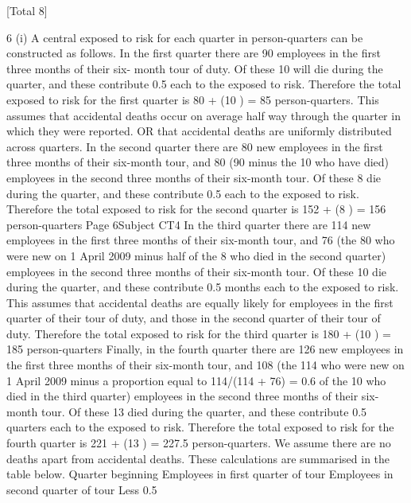 [Total 8]


\newpage


6
(i)
A central exposed to risk for each quarter in person-quarters can be
constructed as follows.
In the first quarter there are 90 employees in the first three months of their six-
month tour of duty. Of these 10 will die during the quarter, and these
contribute 0.5 each to the exposed to risk.
Therefore the total exposed to risk for the first quarter is
80 + (10 ) = 85 person-quarters.
This assumes that accidental deaths occur on average half way
through the quarter in which they were reported. OR that accidental
deaths are uniformly distributed across quarters.
In the second quarter there are 80 new employees in the first three months of
their six-month tour, and 80 (90 minus the 10 who have died) employees in
the second three months of their six-month tour. Of these 8 die during the
quarter, and these contribute 0.5 each to the exposed to risk.
Therefore the total exposed to risk for the second quarter
is 152 + (8 ) = 156 person-quarters
Page 6Subject CT4 %
In the third quarter there are 114 new employees in the first three months of
their six-month tour, and 76 (the 80 who were new on 1 April 2009 minus half
of the 8 who died in the second quarter) employees in the second three
months of their six-month tour. Of these 10 die during the quarter, and these
contribute 0.5 months each to the exposed to risk.
This assumes that accidental deaths are equally likely for employees
in the first quarter of their tour of duty, and those in the second quarter
of their tour of duty.
Therefore the total exposed to risk for the third quarter
is 180 + (10 ) = 185 person-quarters
Finally, in the fourth quarter there are 126 new employees in the first three
months of their six-month tour, and 108 (the 114 who were new on 1 April
2009 minus a proportion equal to 114/(114 + 76) = 0.6 of the 10 who died in
the third quarter) employees in the second three months of their six-month
tour.
Of these 13 died during the quarter, and these contribute
0.5 quarters each to the exposed to risk.
Therefore the total exposed to risk for the fourth quarter is
221 + (13 ) = 227.5 person-quarters.
We assume there are no deaths apart from accidental deaths.
These calculations are summarised in the table below.
Quarter
beginning Employees in
first quarter
of tour Employees in
second quarter
of tour Less 0.5 \times
